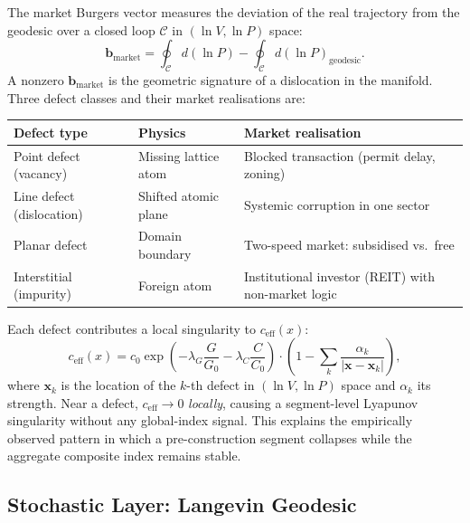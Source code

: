 \documentclass[12pt,a4paper]{article}
\begin{document}
The market Burgers vector measures the deviation of the real trajectory
from the geodesic over a closed loop $\mathcal{C}$ in
$(\ln V, \ln P)$ space:
\begin{equation}
    \mathbf{b}_{\mathrm{market}}
    = \oint_{\mathcal{C}} d(\ln P)
    - \oint_{\mathcal{C}} d(\ln P)_{\mathrm{geodesic}}.
\end{equation}
A nonzero $\mathbf{b}_{\mathrm{market}}$ is the geometric signature of
a dislocation in the manifold. Three defect classes and their market
realisations are:

\begin{center}
\begin{tabular}{p{3.2cm}p{3.2cm}p{6.0cm}}
\toprule
Defect type & Physics & Market realisation \\
\midrule
Point defect (vacancy) & Missing lattice atom &
  Blocked transaction (permit delay, zoning) \\
Line defect (dislocation) & Shifted atomic plane &
  Systemic corruption in one sector \\
Planar defect & Domain boundary &
  Two-speed market: subsidised vs.\ free \\
Interstitial (impurity) & Foreign atom &
  Institutional investor (REIT) with non-market logic \\
\bottomrule
\end{tabular}
\end{center}

Each defect contributes a local singularity to $c_{\mathrm{eff}}(x)$:
\begin{equation}
    c_{\mathrm{eff}}(x) = c_0
    \exp\!\left(-\lambda_G \frac{G}{G_0} - \lambda_C \frac{C}{C_0}\right)
    \cdot \left(1 - \sum_k
    \frac{\alpha_k}{\lvert\mathbf{x} - \mathbf{x}_k\rvert}\right),
\end{equation}
where $\mathbf{x}_k$ is the location of the $k$-th defect in
$(\ln V, \ln P)$ space and $\alpha_k$ its strength. Near a defect,
$c_{\mathrm{eff}} \to 0$ \emph{locally}, causing a segment-level
Lyapunov singularity without any global-index signal. This explains
the empirically observed pattern in which a pre-construction segment
collapses while the aggregate composite index remains stable.

\subsection{Stochastic Layer: Langevin Geodesic}
\end{document}
